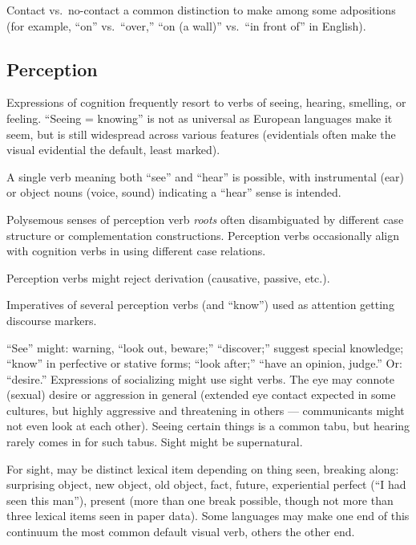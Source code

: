 \documentclass[11pt]{article}
\begin{document}
{Contact vs.\ no-contact a common distinction to make among some
adpositions (for example, ``on'' vs.\ ``over,'' ``on (a wall)''
vs.\ ``in front of'' in English).


\subsection{Perception}
Expressions of cognition frequently resort to verbs of seeing,
hearing, smelling, or feeling.  ``Seeing = knowing'' is not as
universal as European languages make it seem, but is still widespread
across various features (evidentials often make the visual evidential
the default, least marked).

A single verb meaning both ``see'' and ``hear'' is possible, with
instrumental (ear) or object nouns (voice, sound) indicating a
``hear'' sense is intended.

Polysemous senses of perception verb \textit{roots} often
disambiguated by different case structure or complementation
constructions.  Perception verbs occasionally align with cognition
verbs in using different case relations.

Perception verbs might reject derivation (causative, passive, etc.).

Imperatives of several perception verbs (and ``know'') used as
attention getting discourse markers.

``See'' might: warning, ``look out, beware;'' ``discover;'' suggest
special knowledge; ``know'' in perfective or stative forms; ``look
after;'' ``have an opinion, judge.'' Or: ``desire.''  Expressions of
socializing might use sight verbs.  The eye may connote (sexual)
desire or aggression in general (extended eye contact expected in some
cultures, but highly aggressive and threatening in others —
communicants might not even look at each other).  Seeing certain
things is a common tabu, but hearing rarely comes in for such tabus.
Sight might be supernatural.

For sight, may be distinct lexical item depending on thing seen,
breaking along: surprising object, new object, old object, fact,
future, experiential perfect (``I had seen this man''), present (more
than one break possible, though not more than three lexical items seen
in paper data).  Some languages may make one end of this continuum the
most common default visual verb, others the other end.

}
\end{document}
